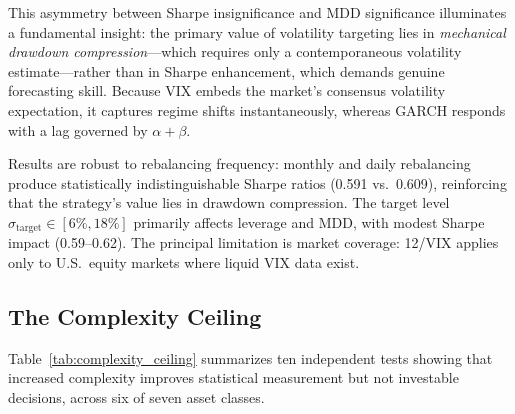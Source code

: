 This asymmetry between Sharpe insignificance and MDD significance illuminates a fundamental insight: the primary value of volatility targeting lies in \textit{mechanical drawdown compression}---which requires only a contemporaneous volatility estimate---rather than in Sharpe enhancement, which demands genuine forecasting skill. Because VIX embeds the market's consensus volatility expectation, it captures regime shifts instantaneously, whereas GARCH responds with a lag governed by $\alpha + \beta$.

Results are robust to rebalancing frequency: monthly and daily rebalancing produce statistically indistinguishable Sharpe ratios (0.591 vs.\ 0.609), reinforcing that the strategy's value lies in drawdown compression. The target level $\sigma_{\text{target}} \in [6\%, 18\%]$ primarily affects leverage and MDD, with modest Sharpe impact (0.59--0.62). The principal limitation is market coverage: 12/VIX applies only to U.S.\ equity markets where liquid VIX data exist.

\subsection{The Complexity Ceiling}

Table~\ref{tab:complexity_ceiling} summarizes ten independent tests showing that increased complexity improves statistical measurement but not investable decisions, across six of seven asset classes.

